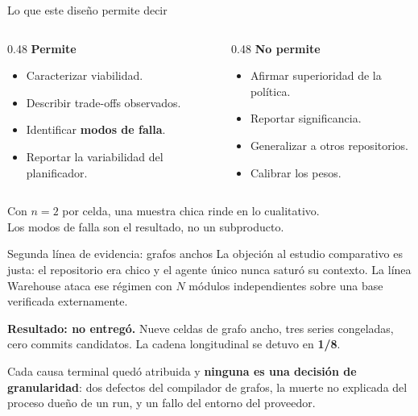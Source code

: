 \documentclass[10pt,aspectratio=169]{beamer}
\begin{document}
\begin{frame}{Lo que este diseño permite decir}
  \begin{columns}[T]
    \begin{column}{0.48\textwidth}
      \textbf{Permite}
      \begin{itemize}
        \item Caracterizar viabilidad.
        \item Describir trade-offs observados.
        \item Identificar \textbf{modos de falla}.
        \item Reportar la variabilidad del planificador.
      \end{itemize}
    \end{column}
    \begin{column}{0.48\textwidth}
      \textbf{No permite}
      \begin{itemize}
        \item Afirmar superioridad de la política.
        \item Reportar significancia.
        \item Generalizar a otros repositorios.
        \item Calibrar los pesos.
      \end{itemize}
    \end{column}
  \end{columns}

  \bigskip
  \pause
  \begin{center}
    Con $n = 2$ por celda, una muestra chica rinde en lo cualitativo.\\
    Los modos de falla son el resultado, no un subproducto.
  \end{center}
\end{frame}


\begin{frame}{Segunda línea de evidencia: grafos anchos}
  La objeción al estudio comparativo es justa: el repositorio era chico y el
  agente único nunca saturó su contexto. La línea Warehouse ataca ese régimen con
  $N$ módulos independientes sobre una base verificada externamente.

  \bigskip
  \pause
  \textbf{Resultado: no entregó.} Nueve celdas de grafo ancho, tres series
  congeladas, cero commits candidatos. La cadena longitudinal se detuvo en
  \textbf{1/8}.

  \bigskip
  \pause
  Cada causa terminal quedó atribuida y \textbf{ninguna es una decisión de
  granularidad}: dos defectos del compilador de grafos, la muerte no explicada
  del proceso dueño de un run, y un fallo del entorno del proveedor.
\end{frame}
\end{document}
